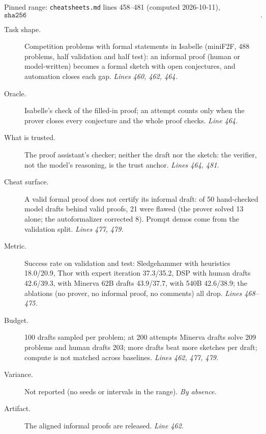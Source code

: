 \documentclass[11pt]{article}
\begin{document}
Pinned range: \texttt{cheatsheets.md} lines 458--481 (computed 2026-10-11),
\[ \texttt{sha256 e4dafe60c3a94bf011321b2f331db4fc667b6ee3fbafdfc9b0f518e3aa104c08}. \]

\begin{description}
\item[Task shape.] Competition problems with formal statements in Isabelle
  (miniF2F, 488 problems, half validation and half test): an informal proof
  (human or model-written) becomes a formal sketch with open conjectures, and
  automation closes each gap. \emph{Lines 460, 462, 464.}
\item[Oracle.] Isabelle's check of the filled-in proof; an attempt counts
  only when the prover closes every conjecture and the whole proof checks.
  \emph{Line 464.}
\item[What is trusted.] The proof assistant's checker; neither the draft
  nor the sketch: the verifier, not the model's reasoning, is the trust
  anchor. \emph{Lines 464, 481.}
\item[Cheat surface.] A valid formal proof does not certify its informal
  draft: of 50 hand-checked model drafts behind valid proofs, 21 were flawed
  (the prover solved 13 alone; the autoformalizer corrected 8). Prompt demos
  come from the validation split. \emph{Lines 477, 479.}
\item[Metric.] Success rate on validation and test: Sledgehammer with
  heuristics 18.0/20.9, Thor with expert iteration 37.3/35.2, DSP with human
  drafts 42.6/39.3, with Minerva 62B drafts 43.9/37.7, with 540B 42.6/38.9;
  the ablations (no prover, no informal proof, no comments) all drop.
  \emph{Lines 468--475.}
\item[Budget.] 100 drafts sampled per problem; at 200 attempts Minerva
  drafts solve 209 problems and human drafts 203; more drafts beat more
  sketches per draft; compute is not matched across baselines. \emph{Lines
  462, 477, 479.}
\item[Variance.] Not reported (no seeds or intervals in the range).
  \emph{By absence.}
\item[Artifact.] The aligned informal proofs are released. \emph{Line 462.}
\end{description}
\end{document}
